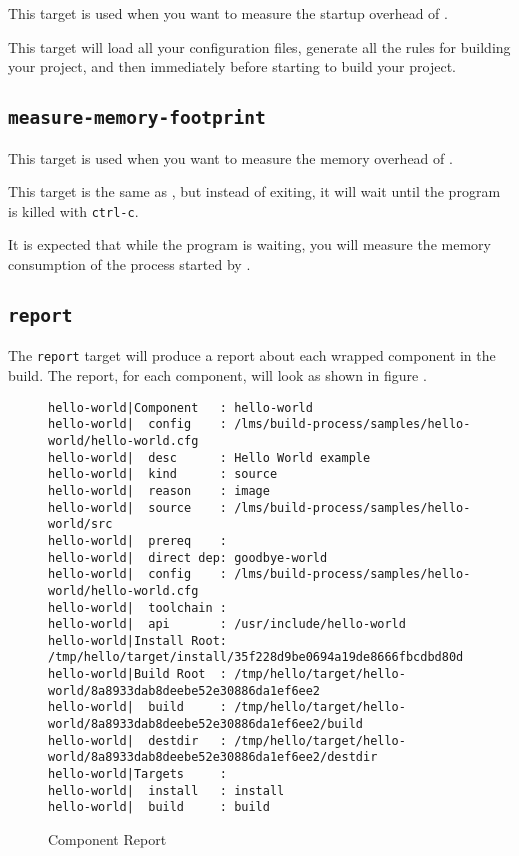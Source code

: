 This target is used when you want to measure the startup overhead of
\lmsbw.

This target will load all your configuration files, generate all the
rules for building your project, and then immediately before starting
to build your project.

\subsection{\texttt{measure-memory-footprint}}

This target is used when you want to measure the memory overhead of
\lmsbw.

This target is the same as , but
instead of exiting, it will wait until the program is killed with
\texttt{ctrl-c}.

It is expected that while the program is waiting, you will measure the
memory consumption of the \make process started by \lmsbw.

\subsection{\texttt{report}}

The \texttt{report} target will produce a report about each wrapped
component in the build.  The report, for each component, will look
as shown in figure .

\begin{landscape}
\begin{figure}
\begin{small}
\begin{verbatim}
hello-world|Component   : hello-world
hello-world|  config    : /lms/build-process/samples/hello-world/hello-world.cfg
hello-world|  desc      : Hello World example
hello-world|  kind      : source
hello-world|  reason    : image
hello-world|  source    : /lms/build-process/samples/hello-world/src
hello-world|  prereq    :
hello-world|  direct dep: goodbye-world
hello-world|  config    : /lms/build-process/samples/hello-world/hello-world.cfg
hello-world|  toolchain :
hello-world|  api       : /usr/include/hello-world
hello-world|Install Root: /tmp/hello/target/install/35f228d9be0694a19de8666fbcdbd80d
hello-world|Build Root  : /tmp/hello/target/hello-world/8a8933dab8deebe52e30886da1ef6ee2
hello-world|  build     : /tmp/hello/target/hello-world/8a8933dab8deebe52e30886da1ef6ee2/build
hello-world|  destdir   : /tmp/hello/target/hello-world/8a8933dab8deebe52e30886da1ef6ee2/destdir
hello-world|Targets     :
hello-world|  install   : install
hello-world|  build     : build
\end{verbatim}
\end{small}
\caption{Component Report}\label{usinglmsbw:component-report}
\end{figure}
\end{landscape}

